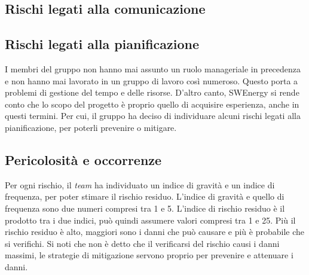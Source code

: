\subsection{Rischi legati alla comunicazione}






\subsection{Rischi legati alla pianificazione}
I membri del gruppo non hanno mai assunto un ruolo manageriale in
precedenza e non hanno mai lavorato in un gruppo di lavoro così
numeroso. Questo porta a problemi di gestione del tempo e delle
risorse. D'altro canto, SWEnergy si rende conto che lo scopo del
progetto è proprio quello di acquisire esperienza, anche in questi
termini. Per cui, il gruppo ha deciso di individuare alcuni
rischi legati alla pianificazione, per poterli prevenire o mitigare.






\subsection{Pericolosità e occorrenze}

Per ogni rischio, il \textit{team} ha individuato un indice di gravità e un
indice di frequenza, per poter stimare il rischio residuo. L'indice di
gravità e quello di frequenza sono due numeri compresi tra 1 e 5. L'indice di
rischio residuo è il prodotto tra i due indici, può quindi assumere valori
compresi tra 1 e 25. Più il rischio residuo è alto, maggiori sono i danni che
può causare e più è probabile che si verifichi. Si noti che non è detto che il
verificarsi del rischio causi i danni massimi, le strategie di
mitigazione servono proprio per prevenire e attenuare i danni.


